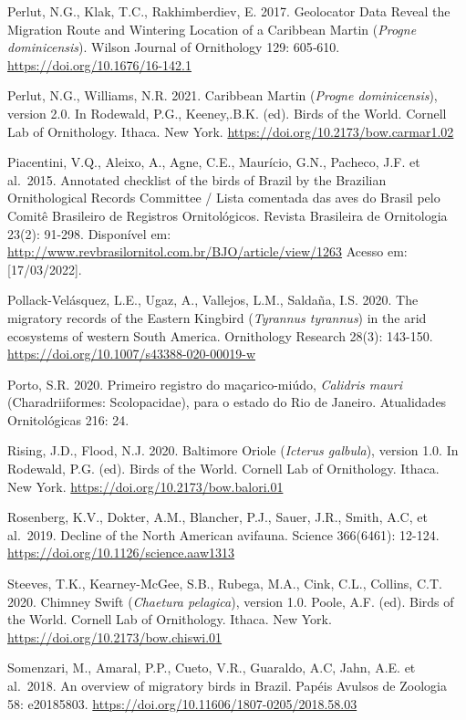 \documentclass[
  oneside]{scrbook}
\begin{document}
Perlut, N.G., Klak, T.C., Rakhimberdiev, E. 2017. Geolocator Data Reveal the Migration Route and Wintering Location of a Caribbean Martin (\emph{Progne dominicensis}). Wilson Journal of Ornithology 129: 605‑610. \url{https://doi.org/10.1676/16-142.1}

Perlut, N.G., Williams, N.R. 2021. Caribbean Martin (\emph{Progne dominicensis}), version 2.0. In Rodewald, P.G., Keeney,.B.K. (ed). Birds of the World. Cornell Lab of Ornithology. Ithaca. New York. \url{https://doi.org/10.2173/bow.carmar1.02}

Piacentini, V.Q., Aleixo, A., Agne, C.E., Maurício, G.N., Pacheco, J.F. et al.~2015. Annotated checklist of the birds of Brazil by the Brazilian Ornithological Records Committee / Lista comentada das aves do Brasil pelo Comitê Brasileiro de Registros Ornitológicos. Revista Brasileira de Ornitologia 23(2): 91-298. Disponível em: \url{http://www.revbrasilornitol.com.br/BJO/article/view/1263} Acesso em: {[}17/03/2022{]}.

Pollack-Velásquez, L.E., Ugaz, A., Vallejos, L.M., Saldaña, I.S. 2020. The migratory records of the Eastern Kingbird (\emph{Tyrannus tyrannus}) in the arid ecosystems of western South America. Ornithology Research 28(3): 143-150. \url{https://doi.org/10.1007/s43388-020-00019-w}

Porto, S.R. 2020. Primeiro registro do maçarico-miúdo, \emph{Calidris mauri} (Charadriiformes: Scolopacidae), para o estado do Rio de Janeiro. Atualidades Ornitológicas 216: 24.

Rising, J.D., Flood, N.J. 2020. Baltimore Oriole (\emph{Icterus galbula}), version 1.0. In Rodewald, P.G. (ed). Birds of the World. Cornell Lab of Ornithology. Ithaca. New York. \url{https://doi.org/10.2173/bow.balori.01}

Rosenberg, K.V., Dokter, A.M., Blancher, P.J., Sauer, J.R., Smith, A.C, et al.~2019. Decline of the North American avifauna. Science 366(6461): 12-124. \url{https://doi.org/10.1126/science.aaw1313}

Steeves, T.K., Kearney-McGee, S.B., Rubega, M.A., Cink, C.L., Collins, C.T. 2020. Chimney Swift (\emph{Chaetura pelagica}), version 1.0. Poole, A.F. (ed). Birds of the World. Cornell Lab of Ornithology. Ithaca. New York. \url{https://doi.org/10.2173/bow.chiswi.01}

Somenzari, M., Amaral, P.P., Cueto, V.R., Guaraldo, A.C, Jahn, A.E. et al.~2018. An overview of migratory birds in Brazil. Papéis Avulsos de Zoologia 58: e20185803. \url{https://doi.org/10.11606/1807-0205/2018.58.03}
\end{document}
